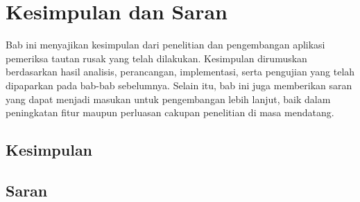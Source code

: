 \chapter{Kesimpulan dan Saran}
\label{chap:kesimpulan-dan-saran}

Bab ini menyajikan kesimpulan dari penelitian dan pengembangan aplikasi pemeriksa tautan rusak yang telah dilakukan. Kesimpulan dirumuskan berdasarkan hasil analisis, perancangan, implementasi, serta pengujian yang telah dipaparkan pada bab-bab sebelumnya. Selain itu, bab ini juga memberikan saran yang dapat menjadi masukan untuk pengembangan lebih lanjut, baik dalam peningkatan fitur maupun perluasan cakupan penelitian di masa mendatang.


\section{Kesimpulan}
\label{sec:06-kesimpulan}
% 


\section{Saran}
\label{sec:06-saran}
% 